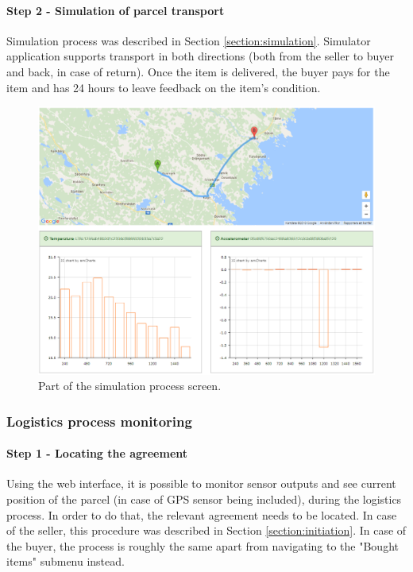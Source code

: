 \paragraph{Step 2 - Simulation of parcel transport}
Simulation process was described in Section \ref{section:simulation}. Simulator application supports transport in both directions (both from the seller to buyer and back, in case of return). Once the item is delivered, the buyer pays for the item and has 24 hours to leave feedback on the item's condition.

\begin{figure}[H]
\centering
\includegraphics[scale=0.36]{app_screens/simulator_transport.png}
\caption{Part of the simulation process screen.}
\label{fig:simtransport}
\end{figure}

\subsubsection{Logistics process monitoring}

\paragraph{Step 1 - Locating the agreement}
Using the web interface, it is possible to monitor sensor outputs and see current position of the parcel (in case of GPS sensor being included), during the logistics process. In order to do that, the relevant agreement needs to be located. In case of the seller, this procedure was described in Section \ref{section:initiation}. In case of the buyer, the process is roughly the same apart from navigating to the "Bought items" submenu instead.

